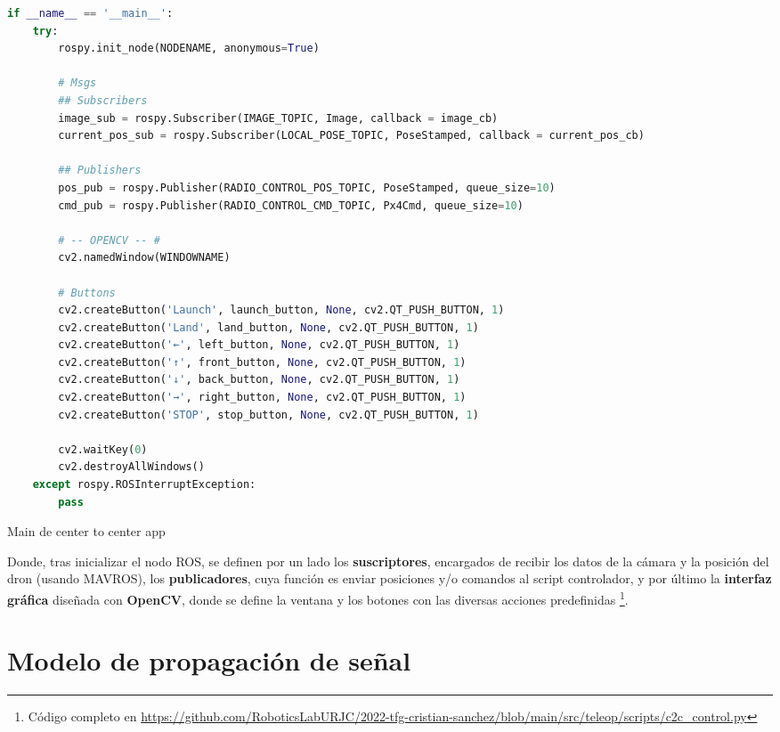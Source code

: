 \begin{code}[H]
\begin{lstlisting}[language=Python]
if __name__ == '__main__':
    try:
        rospy.init_node(NODENAME, anonymous=True)

        # Msgs
        ## Subscribers
        image_sub = rospy.Subscriber(IMAGE_TOPIC, Image, callback = image_cb)
        current_pos_sub = rospy.Subscriber(LOCAL_POSE_TOPIC, PoseStamped, callback = current_pos_cb)

        ## Publishers
        pos_pub = rospy.Publisher(RADIO_CONTROL_POS_TOPIC, PoseStamped, queue_size=10)
        cmd_pub = rospy.Publisher(RADIO_CONTROL_CMD_TOPIC, Px4Cmd, queue_size=10)

        # -- OPENCV -- #
        cv2.namedWindow(WINDOWNAME)

        # Buttons
        cv2.createButton('Launch', launch_button, None, cv2.QT_PUSH_BUTTON, 1)
        cv2.createButton('Land', land_button, None, cv2.QT_PUSH_BUTTON, 1)
        cv2.createButton('←', left_button, None, cv2.QT_PUSH_BUTTON, 1)
        cv2.createButton('↑', front_button, None, cv2.QT_PUSH_BUTTON, 1)
        cv2.createButton('↓', back_button, None, cv2.QT_PUSH_BUTTON, 1)
        cv2.createButton('→', right_button, None, cv2.QT_PUSH_BUTTON, 1)
        cv2.createButton('STOP', stop_button, None, cv2.QT_PUSH_BUTTON, 1)

        cv2.waitKey(0)
        cv2.destroyAllWindows()
    except rospy.ROSInterruptException:
        pass
\end{lstlisting}
\caption[Main de center to center app]{Main de center to center app}
\label{cod:c2c_app}
\end{code}

Donde, tras inicializar el nodo \ac{ROS}, se definen por un lado los \textbf{suscriptores}, encargados de recibir los datos de la cámara y la posición del dron (usando MAVROS), los \textbf{publicadores}, cuya función es enviar posiciones y/o comandos al script controlador, y por último la \textbf{interfaz gráfica} diseñada con \textbf{OpenCV}, donde se define la ventana y los botones con las diversas acciones predefinidas \footnote{Código completo en \url{https://github.com/RoboticsLabURJC/2022-tfg-cristian-sanchez/blob/main/src/teleop/scripts/c2c_control.py}}.\\

\section{Modelo de propagación de señal}
\label{sec:signals}

